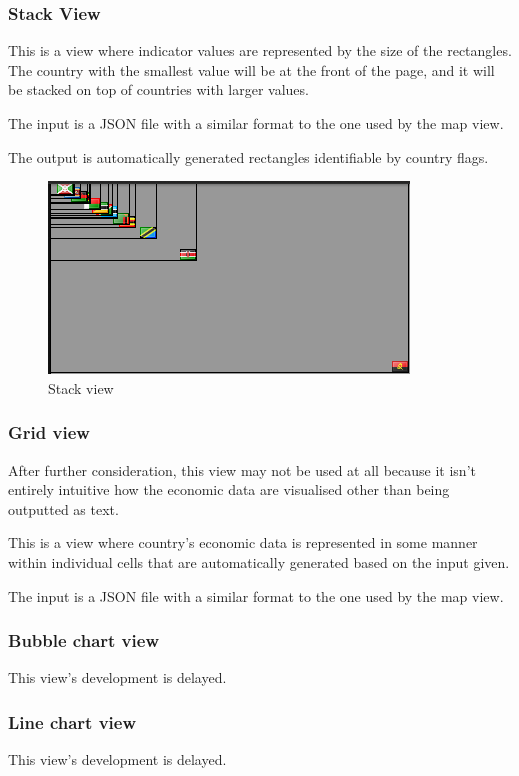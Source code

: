 \documentclass[12pt,a4paper,twoside]{article}
\begin{document}
\subsubsection{Stack View}
This is a view where indicator values are represented by the size of the rectangles. The country with the smallest value will be at the front of the page, and it will be stacked on top of countries with larger values.

The input is a JSON file with a similar format to the one used by the map view. 

The output is automatically generated rectangles identifiable by country flags.


\begin{figure}[H]
\centering
\includegraphics[scale=1]{visualisation/stack_view.png}
\caption{Stack view}
\end{figure}


\subsubsection{Grid view}
After further consideration, this view may not be used at all because it isn't entirely intuitive how the economic data are visualised other than being outputted as text.

This is a view where country's economic data is represented in some manner within individual cells that are automatically generated based on the input given. 

The input is a JSON file with a similar format to the one used by the map view. 

\subsubsection{Bubble chart view}
This view's development is delayed.

\subsubsection{Line chart view}
This view's development is delayed.
\end{document}
